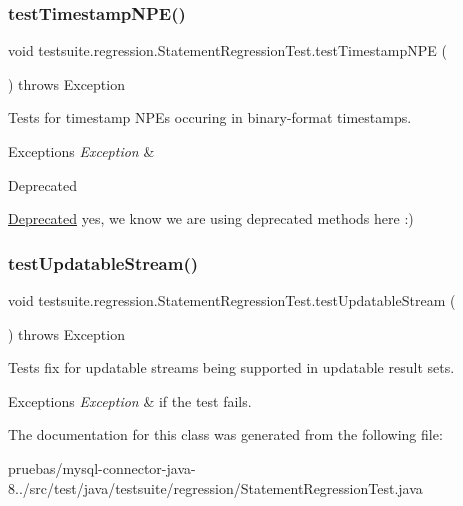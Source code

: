 \subsubsection{\texorpdfstring{test\+Timestamp\+N\+P\+E()}{testTimestampNPE()}}
{\footnotesize\ttfamily void testsuite.\+regression.\+Statement\+Regression\+Test.\+test\+Timestamp\+N\+PE (\begin{DoxyParamCaption}{ }\end{DoxyParamCaption}) throws Exception}

Tests for timestamp N\+P\+Es occuring in binary-\/format timestamps.


\begin{DoxyExceptions}{Exceptions}
{\em Exception} & \\
\hline
\end{DoxyExceptions}
\begin{DoxyRefDesc}{Deprecated}
\item[\mbox{\hyperlink{deprecated__deprecated000009}{Deprecated}}]yes, we know we are using deprecated methods here \+:) \end{DoxyRefDesc}
\mbox{\label{classtestsuite_1_1regression_1_1_statement_regression_test_a7695fd8186a02b78d65dc3af0db02e34}} 
\subsubsection{\texorpdfstring{test\+Updatable\+Stream()}{testUpdatableStream()}}
{\footnotesize\ttfamily void testsuite.\+regression.\+Statement\+Regression\+Test.\+test\+Updatable\+Stream (\begin{DoxyParamCaption}{ }\end{DoxyParamCaption}) throws Exception}

Tests fix for updatable streams being supported in updatable result sets.


\begin{DoxyExceptions}{Exceptions}
{\em Exception} & if the test fails. \\
\hline
\end{DoxyExceptions}


The documentation for this class was generated from the following file\+:\begin{DoxyCompactItemize}
\item 
pruebas/mysql-\/connector-\/java-\/8../src/test/java/testsuite/regression/Statement\+Regression\+Test.\+java\end{DoxyCompactItemize}
